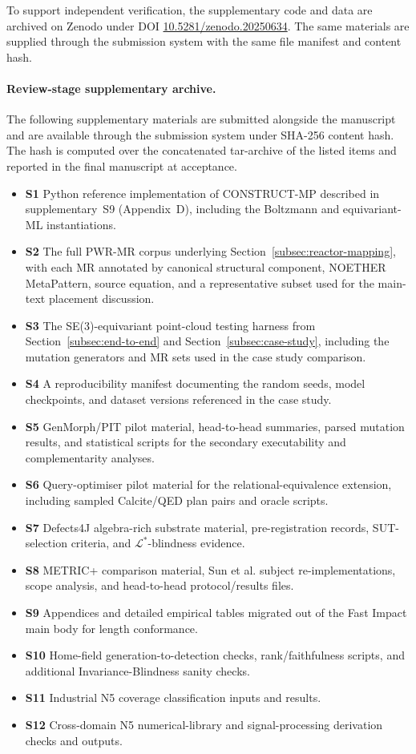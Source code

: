 \documentclass[acmsmall,screen,review]{acmart}
\begin{document}
To support independent verification, the supplementary code and data are archived
on Zenodo under DOI \href{https://doi.org/10.5281/zenodo.20250634}{10.5281/zenodo.20250634}.
The same materials are supplied through the submission system with the same
file manifest and content hash.

\paragraph{Review-stage supplementary archive.} The following supplementary materials are submitted alongside the manuscript and are available through the submission system under SHA-256 content hash. The hash is computed over the concatenated tar-archive of the listed items and reported in the final manuscript at acceptance.
\begin{itemize}
    \item \textbf{S1} Python reference implementation of CONSTRUCT-MP described in supplementary~S9 (Appendix~D), including the Boltzmann and equivariant-ML instantiations.
    \item \textbf{S2} The full PWR-MR corpus underlying Section~\ref{subsec:reactor-mapping}, with each MR annotated by canonical structural component, NOETHER MetaPattern, source equation, and a representative subset used for the main-text placement discussion.
    \item \textbf{S3} The SE(3)-equivariant point-cloud testing harness from Section~\ref{subsec:end-to-end} and Section~\ref{subsec:case-study}, including the mutation generators and MR sets used in the case study comparison.
    \item \textbf{S4} A reproducibility manifest documenting the random seeds, model checkpoints, and dataset versions referenced in the case study.
    \item \textbf{S5} GenMorph/PIT pilot material, head-to-head summaries, parsed mutation results, and statistical scripts for the secondary executability and complementarity analyses.
    \item \textbf{S6} Query-optimiser pilot material for the relational-equivalence extension, including sampled Calcite/QED plan pairs and oracle scripts.
    \item \textbf{S7} Defects4J algebra-rich substrate material, pre-registration records, SUT-selection criteria, and $\mathcal{L}^{*}$-blindness evidence.
    \item \textbf{S8} METRIC+ comparison material, Sun et al. subject re-implementations, scope analysis, and head-to-head protocol/results files.
    \item \textbf{S9} Appendices and detailed empirical tables migrated out of the Fast Impact main body for length conformance.
    \item \textbf{S10} Home-field generation-to-detection checks, rank/faithfulness scripts, and additional Invariance-Blindness sanity checks.
    \item \textbf{S11} Industrial N5 coverage classification inputs and results.
    \item \textbf{S12} Cross-domain N5 numerical-library and signal-processing derivation checks and outputs.
\end{itemize}
\end{document}
